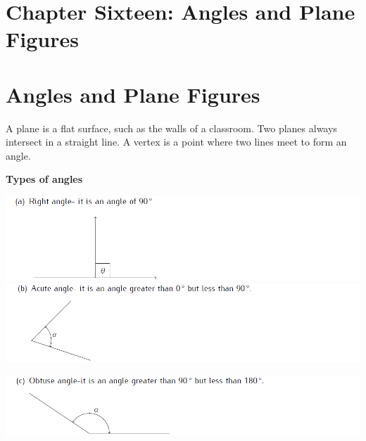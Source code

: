 \documentclass[
  a4paperpaper,
]{scrbook}
\begin{document}

\hypertarget{chapter-sixteen-angles-and-plane-figures}{%
\chapter{Chapter Sixteen: Angles and Plane
Figures}\label{chapter-sixteen-angles-and-plane-figures}}


\hypertarget{angles-and-plane-figures}{%
\chapter*{Angles and Plane Figures}\label{angles-and-plane-figures}}


A plane is a flat surface, such as the walls of a classroom. Two planes
always intersect in a straight line. A vertex is a point where two lines
meet to form an angle.

\textbf{Types of angles}

\includegraphics{images/Cpt15_anglesa.png}
\includegraphics{images/Cpt15_anglesb.png}

\includegraphics{images/Cpt15_anglesc.png}
\end{document}
